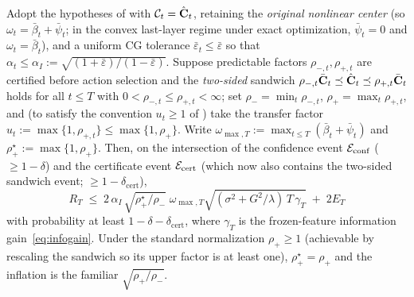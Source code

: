 \documentclass[twoside]{article}
\newcommand{\Calg}{\mathcal{C}}                 %
\begin{document}
\begin{corollary}\label{cor:twosided}
Adopt the hypotheses of  with $\Calg_t=\hat\bC_t$, retaining the
\emph{original nonlinear center} (so $\omega_t=\bar\beta_t+\bar\psi_t$; in the
convex last-layer regime under exact optimization, $\bar\psi_t=0$ and
$\omega_t=\bar\beta_t$), and a uniform
CG tolerance $\bar\varepsilon_t\le\bar\varepsilon$ so that
$\alpha_t\le\alpha_I:=\sqrt{(1+\bar\varepsilon)/(1-\bar\varepsilon)}$.
Suppose predictable factors $\rho_{-,t},\rho_{+,t}$ are certified before
action selection and the \emph{two-sided} sandwich
$\rho_{-,t}\bar{\mathbf{C}}_t\preceq\hat{\mathbf{C}}_t\preceq\rho_{+,t}\bar{\mathbf{C}}_t$ holds for all
$t\le T$ with $0<\rho_{-,t}\le\rho_{+,t}<\infty$; set
$\rho_-=\min_t\rho_{-,t}$, $\rho_+=\max_t\rho_{+,t}$, and (to satisfy the
convention $u_t\ge1$ of ) take the transfer factor
$u_t:=\max\{1,\rho_{+,t}\}\le\max\{1,\rho_+\}$.  Write
$\omega_{\max,T}:=\max_{t\le T}(\bar\beta_t+\bar\psi_t)$ and
$\rho_+^{\star}:=\max\{1,\rho_+\}$.  Then, on the
intersection of the confidence event $\mathcal{E}_{\mathrm{conf}}$ ($\ge1-\delta$) and the
certificate event $\mathcal{E}_{\mathrm{cert}}$ (which now also contains the two-sided
sandwich event; $\ge1-\delta_{\mathrm{cert}}$),
\[
  R_T
  \;\le\;
  2\,\alpha_I\,\sqrt{\rho_+^{\star}/\rho_-}\;\omega_{\max,T}
  \sqrt{(\sigma^2+G^2/\lambda)\,T\,\gamma_T} \;+\; 2E_T
\]
with probability at least $1-\delta-\delta_{\mathrm{cert}}$, where $\gamma_T$ is
the frozen-feature information gain~\eqref{eq:infogain}.  Under the standard
normalization $\rho_+\ge1$ (achievable by rescaling the sandwich so its upper
factor is at least one), $\rho_+^{\star}=\rho_+$ and the inflation is the familiar
$\sqrt{\rho_+/\rho_-}$.
\end{corollary}
\end{document}
